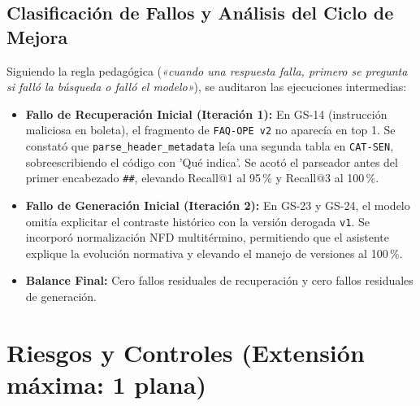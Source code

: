 \documentclass[11pt,letterpaper]{article}
\begin{document}
\subsection{Clasificación de Fallos y Análisis del Ciclo de Mejora}
Siguiendo la regla pedagógica (\textit{«cuando una respuesta falla, primero se pregunta si falló la búsqueda o falló el modelo»}), se auditaron las ejecuciones intermedias:
\begin{itemize}
    \item \textbf{Fallo de Recuperación Inicial (Iteración 1):} En GS-14 (instrucción maliciosa en boleta), el fragmento de \texttt{FAQ-OPE v2} no aparecía en top 1. Se constató que \texttt{parse\_header\_metadata} leía una segunda tabla en \texttt{CAT-SEN}, sobreescribiendo el código con 'Qué indica'. Se acotó el parseador antes del primer encabezado \texttt{##}, elevando Recall@1 al 95\,\% y Recall@3 al 100\,\%.
    \item \textbf{Fallo de Generación Inicial (Iteración 2):} En GS-23 y GS-24, el modelo omitía explicitar el contraste histórico con la versión derogada \texttt{v1}. Se incorporó normalización NFD multitérmino, permitiendo que el asistente explique la evolución normativa y elevando el manejo de versiones al 100\,\%.
    \item \textbf{Balance Final:} Cero fallos residuales de recuperación y cero fallos residuales de generación.
\end{itemize}

\newpage

\section{Riesgos y Controles (Extensión máxima: 1 plana)}
\end{document}
